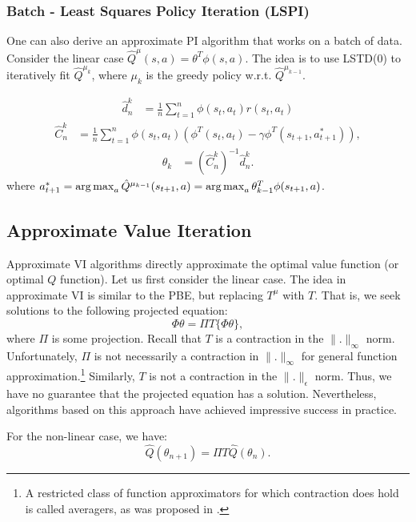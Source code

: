 \subsubsection{Batch - Least Squares Policy Iteration (LSPI)}
One can also derive an approximate PI algorithm that works on a batch of data. Consider the linear case $\hat{Q}^\mu(s,a) = \theta^T \phi(s,a)$. The idea is to use LSTD(0) to iteratively fit $\hat{Q}^{\mu_k}$, where $\mu_k$ is the greedy policy w.r.t. $\hat{Q}^{\mu_{k-1}}$.

\begin{align*}
\hat{d}_n^k &= \frac{1}{n} \sum_{t=1}^n  {\phi}(s_t, a_t) r(s_t,a_t) 
\end{align*}
\begin{align*}
\hat{C}_n^k &= \frac{1}{n} \sum_{t=1}^n {\phi}(s_t,a_t)( {\phi}^T(s_t,a_t)-\gamma {\phi}^T(s_{t+1},a^*_{t+1})),
\end{align*}
\begin{align*}
\theta_k &= (\hat{C}_n^k)^{-1} \hat{d}_n^k.
\end{align*}
where $a^*_{t+1} = \argmax_a \hat{Q}^{\mu_{k-1}}(s_{t+1},a) = \argmax_a \theta_{k-1}^T\phi(s_{t+1},a)$.

\subsection{Approximate Value Iteration}
Approximate VI algorithms directly approximate the optimal value function (or optimal $Q$ function). Let us first consider the linear case. The idea in approximate VI is similar to the PBE, but replacing $T^\mu$ with $T$. That is, we seek solutions to the following projected equation:
\begin{equation*}
    \Phi \theta = \Pi T \{\Phi \theta\},
\end{equation*}
where $\Pi$ is some projection. Recall that $T$ is a contraction in the $\|.\|_\infty$ norm. Unfortunately, $\Pi$ is not necessarily a contraction in $\|.\|_\infty$ for general function approximation.\footnote{A restricted class of function approximators for which contraction does hold is called averagers, as was proposed in \cite{gordon1995stable}.} Similarly, $T$ is not a contraction in the $\|.\|_\epsilon$ norm. Thus, we have no guarantee that the projected equation has a solution. Nevertheless, algorithms based on this approach have achieved impressive success in practice. 

For the non-linear case, we have:
\begin{equation*}
    \hat{Q}(\theta_{n+1}) = \Pi T \hat{Q}(\theta_{n}).
\end{equation*}

